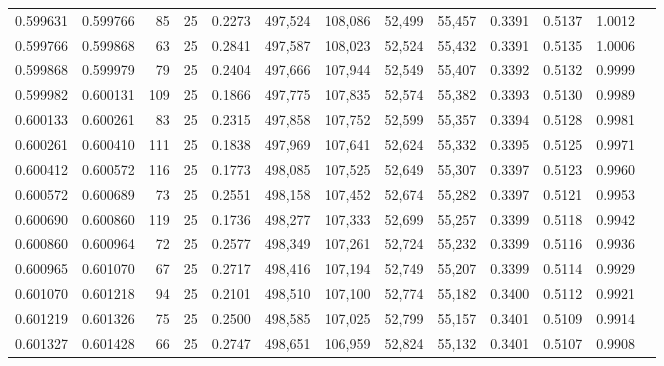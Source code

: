 \begin{tabular}{rrrrrrrrrrrrr}
0.599631 & 0.599766 &    85 &  25 &                                     0.2273 & 497,524 & 108,086 &  52,499 &  55,457 & 0.3391 & 0.5137 & 1.0012 \\
0.599766 & 0.599868 &    63 &  25 &                                     0.2841 & 497,587 & 108,023 &  52,524 &  55,432 & 0.3391 & 0.5135 & 1.0006 \\
0.599868 & 0.599979 &    79 &  25 &                                     0.2404 & 497,666 & 107,944 &  52,549 &  55,407 & 0.3392 & 0.5132 & 0.9999 \\
0.599982 & 0.600131 &   109 &  25 &                                     0.1866 & 497,775 & 107,835 &  52,574 &  55,382 & 0.3393 & 0.5130 & 0.9989 \\
0.600133 & 0.600261 &    83 &  25 &                                     0.2315 & 497,858 & 107,752 &  52,599 &  55,357 & 0.3394 & 0.5128 & 0.9981 \\
0.600261 & 0.600410 &   111 &  25 &                                     0.1838 & 497,969 & 107,641 &  52,624 &  55,332 & 0.3395 & 0.5125 & 0.9971 \\
0.600412 & 0.600572 &   116 &  25 &                                     0.1773 & 498,085 & 107,525 &  52,649 &  55,307 & 0.3397 & 0.5123 & 0.9960 \\
0.600572 & 0.600689 &    73 &  25 &                                     0.2551 & 498,158 & 107,452 &  52,674 &  55,282 & 0.3397 & 0.5121 & 0.9953 \\
0.600690 & 0.600860 &   119 &  25 &                                     0.1736 & 498,277 & 107,333 &  52,699 &  55,257 & 0.3399 & 0.5118 & 0.9942 \\
0.600860 & 0.600964 &    72 &  25 &                                     0.2577 & 498,349 & 107,261 &  52,724 &  55,232 & 0.3399 & 0.5116 & 0.9936 \\
0.600965 & 0.601070 &    67 &  25 &                                     0.2717 & 498,416 & 107,194 &  52,749 &  55,207 & 0.3399 & 0.5114 & 0.9929 \\
0.601070 & 0.601218 &    94 &  25 &                                     0.2101 & 498,510 & 107,100 &  52,774 &  55,182 & 0.3400 & 0.5112 & 0.9921 \\
0.601219 & 0.601326 &    75 &  25 &                                     0.2500 & 498,585 & 107,025 &  52,799 &  55,157 & 0.3401 & 0.5109 & 0.9914 \\
0.601327 & 0.601428 &    66 &  25 &                                     0.2747 & 498,651 & 106,959 &  52,824 &  55,132 & 0.3401 & 0.5107 & 0.9908 \\

\end{tabular}
